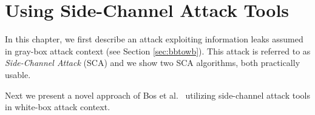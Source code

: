 \chapter{Using Side-Channel Attack Tools}
\label{chap:attack}

In this chapter, we first describe an attack exploiting information leaks assumed in gray-box attack context (see Section \ref{sec:bbtowb}). This attack is referred to as {\em Side-Channel Attack} (SCA) and we show two SCA algorithms, both practically usable.

Next we present a novel approach of Bos et al.\ \cite{bos2015differential} utilizing side-channel attack tools in white-box attack context.





